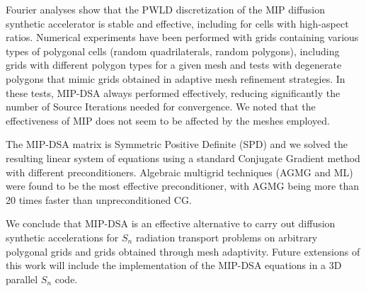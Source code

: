 \documentclass[preprint,10pt]{elsarticle}
\renewcommand{\(}{\left(}
\renewcommand{\)}{\right)}
\renewcommand{\[}{\left[}
\renewcommand{\]}{\right]}
\newcommand{\sn}{\ensuremath{S_n}\xspace}
\begin{document}
Fourier analyses show that the PWLD discretization of the MIP diffusion synthetic accelerator 
is stable and effective, including for cells with high-aspect ratios. 
%
Numerical experiments have been performed with grids containing various types of polygonal cells
(random quadrilaterals, random polygons), including
grids with different polygon types for a given mesh and tests with degenerate polygons that mimic
grids obtained in adaptive mesh refinement strategies. In these tests, MIP-DSA always performed effectively,
reducing significantly the number of Source Iterations needed for convergence. 
We noted that the effectiveness of MIP does not seem to be affected by the meshes employed. 
%

The MIP-DSA  matrix is Symmetric Positive Definite (SPD) and we solved the resulting linear system 
of equations using a standard Conjugate Gradient method with different preconditioners. 
Algebraic multigrid techniques (AGMG and ML) were found to be the most effective preconditioner, with AGMG 
being more than 20 times faster than unpreconditioned CG.

We conclude that MIP-DSA is an effective alternative to
carry out diffusion synthetic accelerations for \sn radiation transport problems on arbitrary polygonal grids and 
grids obtained through mesh adaptivity.
Future extensions of this work will include the implementation of the MIP-DSA equations in a 3D parallel \sn code.





%



\end{document}
